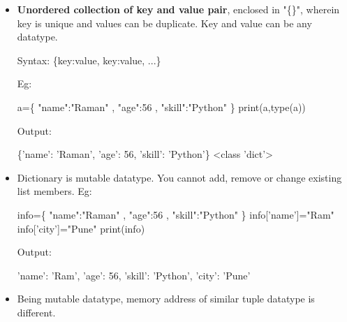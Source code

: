 
\begin{flushleft}
	\begin{itemize}
		\item \textbf{Unordered collection of key and value pair}, enclosed in "\{\}", wherein key is unique and values can be duplicate. Key and value can be any datatype.
		\begin{tcolorbox}[breakable,notitle,boxrule=1pt,colback=pink,colframe=pink]
			\color{black}
			\font=8pt
			Syntax: \{key:value, key:value, ...\}
			\font=4pt
		\end{tcolorbox}
		
		Eg:	
		\begin{tcolorbox}[breakable,notitle,boxrule=-0pt,colback=code,colframe=code]
			\color{white}
			\font=8pt
			a=\{ "name":"Raman" , "age":56 , "skill":"Python" \}
			\newline
			print(a,type(a))
			\font=4pt
		\end{tcolorbox}
		
		Output:
		\begin{tcolorbox}[breakable,notitle,boxrule=-0pt,colback=output,colframe=output]
			\color{black}
			\{'name': 'Raman', 'age': 56, 'skill': 'Python'\} <class 'dict'>
			\font=4pt
		\end{tcolorbox}
		
		\bigskip
		
		\item Dictionary is mutable datatype. You cannot add, remove or change existing list members.
		\newline
		Eg:			
		\begin{tcolorbox}[breakable,notitle,boxrule=-0pt,colback=code,colframe=code]
			\color{white}
			\font=8pt
			info=\{ "name":"Raman" , "age":56 , "skill":"Python" \} \newline
			info['name']="Ram" \newline
			info['city']="Pune" \newline
			print(info)
			\font=4pt
		\end{tcolorbox}
		
		Output:
		\begin{tcolorbox}[breakable,notitle,boxrule=-0pt,colback=output,colframe=output]
			\color{black}
			{'name': 'Ram', 'age': 56, 'skill': 'Python', 'city': 'Pune'}
			\font=4pt
		\end{tcolorbox}
		
		\bigskip
		\item Being mutable datatype, memory address of similar tuple datatype is different.
		
	\end{itemize}
	
\end{flushleft}

\newpage

